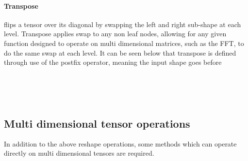 \paragraph{Transpose} flips a tensor over its diagonal by swapping the left and
right sub-shape at each level.
Transpose applies swap to any non leaf nodes, allowing for any given 
function designed to operate on multi dimensional matrices, such as the FFT, to
do the same swap at each level.
It can be seen below that transpose is defined through use of the postfix operator, 
meaning the input shape goes before 
\begin{code}%
%
\>[2]\AgdaSpace{}%
\AgdaSpace{}%
\<%
\\
%
\>[2]\AgdaSpace{}%
\AgdaSymbol{:}\AgdaSpace{}%
\AgdaSpace{}%
\AgdaSpace{}%
\<%
\\
%
\>[2]\AgdaSpace{}%
\AgdaSymbol{(}\AgdaSpace{}%
%
\>[12]\AgdaSymbol{)}\AgdaSpace{}%
\AgdaSymbol{=}\AgdaSpace{}%
\AgdaSpace{}%
\<%
\\
%
\>[2]\AgdaSpace{}%
\AgdaSymbol{(}\AgdaSpace{}%
\AgdaSpace{}%
\AgdaSymbol{)}\AgdaSpace{}%
\AgdaSymbol{=}\AgdaSpace{}%
\AgdaSymbol{(}\AgdaSpace{}%
\AgdaSymbol{)}\AgdaSpace{}%
\AgdaSpace{}%
\AgdaSymbol{(}\AgdaSpace{}%
\AgdaSymbol{)}\<%
\end{code}


\subsection{Multi dimensional tensor operations}
In addition to the above reshape operations, some methods which can operate 
directly on multi dimensional tensors are required.
